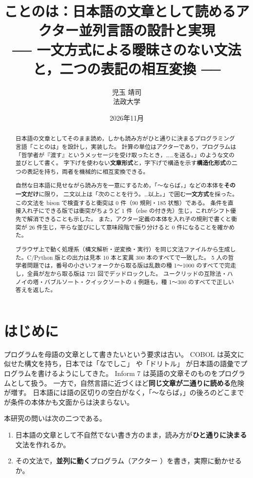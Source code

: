 \documentclass[a4paper,10pt]{ltjsarticle}
\title{ことのは：日本語の文章として読めるアクター並列言語の設計と実現\\[4pt]
\large ── 一文方式による曖昧さのない文法と，二つの表記の相互変換 ──}
\author{児玉 靖司\\ 法政大学}
\date{2026年11月}
\begin{document}
\maketitle

\begin{abstract}
日本語の文章としてそのまま読め，しかも読み方がひと通りに決まるプログラミング言語「ことのは」を設計し，実装した。
計算の単位はアクターであり，プログラムは「哲学者が『渡す』というメッセージを受け取ったとき，……を送る。」のような文の並びとして書く。
字下げを使わない\textbf{文章形式}と，字下げで構造を示す\textbf{構造化形式}の二つの表記を持ち，両者を機械的に相互変換できる。

自然な日本語に見せながら読み方を一意にするため，「〜ならば，」などの本体を\textbf{その一文だけ}に限り，
二文以上は「次のことを行う。…以上。」で囲む\textbf{一文方式}を採った。
この文法を bison で検査すると衝突は 0 件（90 規則・185 状態）である。
条件を直接入れ子にできる版では衝突がちょうど 1 件（else の付き先）生じ，これがシフト優先で解消できることも示した。
また，アクター定義の本体を入れ子の規則で書くと衝突が 26 件生じ，平らな並びにして意味段階で振り分けると 0 件になることを確かめた。

ブラウザ上で動く処理系（構文解析・逆変換・実行）を同じ文法ファイルから生成した。C/Python 版との出力は見本 10 本と変異 300 本のすべてで一致した。
5 人の哲学者問題では，番号の小さいフォークから取る版は乱数の種 1〜1000 のすべてで完走し，全員が左から取る版は 721 回でデッドロックした。
ユークリッドの互除法・ハノイの塔・バブルソート・クイックソートの 4 例題も，種 1〜300 のすべてで正しい答えを返した。
\end{abstract}

\section{はじめに}

プログラムを母語の文章として書きたいという要求は古い。
COBOL は英文に似せた構文を持ち，日本では「なでしこ」\cite{nadesiko} や「ドリトル」\cite{dolittle} が日本語の語彙でプログラムを書けるようにしてきた。
Inform 7 \cite{inform7} は英語の文章そのものをプログラムとして扱う。
一方で，自然言語に近づくほど\textbf{同じ文章が二通りに読める}危険が増す。
日本語には語の区切りの空白がなく，「〜ならば，」の後ろのどこまでが条件の本体かも文面からは決まらない。

本研究の問いは次の二つである。
\begin{enumerate}
\item 日本語の文章として不自然でない書き方のまま，読み方が\textbf{ひと通りに決まる}文法を作れるか。
\item その文法で，\textbf{並列に動く}プログラム（アクター \cite{hewitt73,agha86}）を書き，実際に動かせるか。
\end{enumerate}
\end{document}
